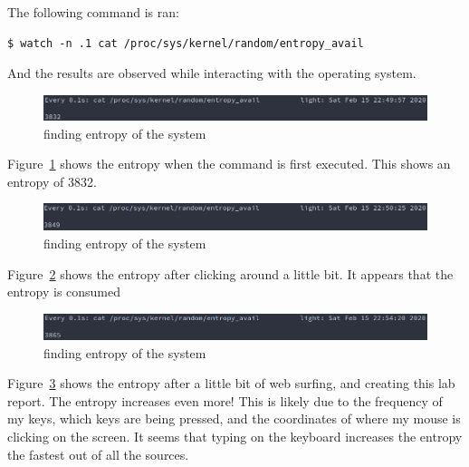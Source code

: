 \documentclass[12pt]{article}
\begin{document}
The following command is ran:
\begin{verbatim}
$ watch -n .1 cat /proc/sys/kernel/random/entropy_avail
\end{verbatim}

And the results are observed while interacting with the operating system.

\begin{figure}[H]
    \begin{center}
        \includegraphics[scale=0.6]{t3p0.png}
    \end{center}{}
    \caption{finding entropy of the system}
    \label{fig:t3p0}
\end{figure}

Figure~\ref{fig:t3p0} shows the entropy when the command is first executed. This shows an entropy of 3832.

\begin{figure}[H]
    \begin{center}
        \includegraphics[scale=0.6]{t3p1.png}
    \end{center}{}
    \caption{finding entropy of the system}
    \label{fig:t3p1}
\end{figure}

Figure~\ref{fig:t3p1} shows the entropy after clicking around a little bit. It appears that the entropy is consumed

\begin{figure}[H]
    \begin{center}
        \includegraphics[scale=0.6]{t3p4.png}
    \end{center}{}
    \caption{finding entropy of the system}
    \label{fig:t3p4}
\end{figure}

Figure~\ref{fig:t3p4} shows the entropy after a little bit of web surfing, and creating this lab report. The entropy increases even more! This is likely due to the frequency of my keys, which keys are being pressed, and the coordinates of where my mouse is clicking on the screen. It seems that typing on the keyboard increases the entropy the fastest out of all the sources.
\end{document}
